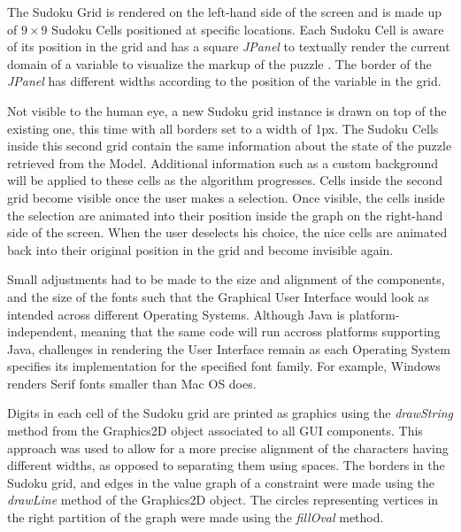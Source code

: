 \documentclass{l4proj}
\begin{document}
\noindent The Sudoku Grid is rendered on the left-hand side of the screen and is made up of $9 \times 9$ Sudoku Cells positioned at specific locations. Each Sudoku Cell is aware of its position in the grid and has a square \textit{JPanel} to textually render the current domain of a variable to visualize the markup of the puzzle \cite{crook2009pencil}. The border of the \textit{JPanel} has different widths according to the position of the variable in the grid.

\noindent Not visible to the human eye, a new Sudoku grid instance is drawn on top of the existing one, this time with all borders set to a width of 1px. The Sudoku Cells inside this second grid contain the same information about the state of the puzzle retrieved from the Model. Additional information such as a custom background will be applied to these cells as the algorithm progresses. Cells inside the second grid become visible once the user makes a selection. Once visible, the cells inside the selection are animated into their position inside the graph on the right-hand side of the screen. When the user deselects his choice, the nice cells are animated back into their original position in the grid and become invisible again.

\noindent Small adjustments had to be made to the size and alignment of the components, and the size of the fonts such that the Graphical User Interface would look as intended across different Operating Systems. Although Java is platform-independent, meaning that the same code will run accross platforms supporting Java, challenges in rendering the User Interface remain as each Operating System specifies its implementation for the specified font family. For example, Windows renders Serif fonts smaller than Mac OS does.

\noindent Digits in each cell of the Sudoku grid are printed as graphics using the \textit{drawString} method from the Graphics2D object associated to all GUI components. This approach was used to allow for a more precise alignment of the characters having different widths, as opposed to separating them using spaces. The borders in the Sudoku grid, and edges in the value graph of a constraint were made using the \textit{drawLine} method of the Graphics2D object. The circles representing vertices in the right partition of the graph were made using the \textit{fillOval} method.
\end{document}
